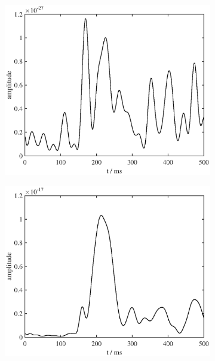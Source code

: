 \documentclass[doc,a4paper,12pt]{apa6}
\begin{document}
\begin{figure}
  \captionsetup{justification=centering}
  \begin{subfigure}[c]{0.47\textwidth}
    \includegraphics[width=\textwidth]{ergebnisse/pa07/pa07_eve2_raw_lcmv_timecourse.eps}
    \label{img:pa07:zeit:raw-lcmv}
  \end{subfigure}\hspace*{0.04\textwidth}
  \begin{subfigure}[c]{0.47\textwidth}
    \includegraphics[width=\textwidth]{ergebnisse/pa07/pa07_eve2_raw_mne_timecourse.eps}

\end{subfigure}
\end{figure}
\end{document}
